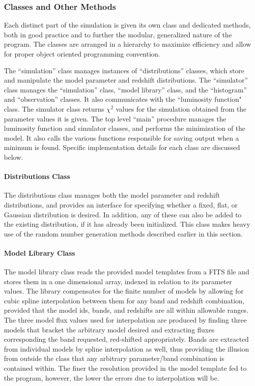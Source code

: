 \documentclass[twocolumn,letterpaper,10pt]{article}
\begin{document}
\subsubsection{Classes and Other Methods}
Each distinct part of the simulation is given its own class and dedicated methods, both in good practice and to further the modular, generalized nature of the program. The classes are arranged in a hierarchy to maximize efficiency and allow for proper object oriented programming convention. 

The ``simulation'' class manages instances of ``distributions'' classes, which store and manipulate the model parameter and redshift distributions. The ``simulator'' class manages the ``simulation'' class, ``model library'' class, and the ``histogram'' and ``observation'' classes. It also communicates with the ``luminosity function" class. The simulator class returns $\chi^2$ values for the simulation obtained from the parameter values it is given. The top level ``main'' procedure manages the luminosity function and simulator classes, and performs the minimization of the model. It also calls the various functions responsible for saving output when a minimum is found. Specific implementation details for each class are discussed below.

\paragraph{Distributions Class}
The distributions class manages both the model parameter and redshift distributions, and provides an interface for specifying whether a fixed, flat, or Gaussian distribution is desired. In addition, any of these can also be added to the existing distribution, if it has already been initialized. This class makes heavy use of the random number generation methods described earlier in this section.

\paragraph{Model Library Class}\label{class:models}
The model library class reads the provided model templates from a FITS file and stores them in a one dimensional array, indexed in relation to its parameter values. The library compensates for the finite number of models by allowing for cubic spline interpolation between them for any band and redshift combination, provided that the model ids, bands, and redshifts are all within allowable ranges. The three model flux values used for interpolation are produced by finding three models that bracket the arbitrary model desired and extracting fluxes corresponding the band requested, red-shifted appropriately. Bands are extracted from individual models by spline interpolation as well, thus providing the illusion from outside the class that any arbitrary parameter/band combination is contained within. The finer the resolution provided in the model template fed to the program, however, the lower the errors due to interpolation will be. 
\end{document}
